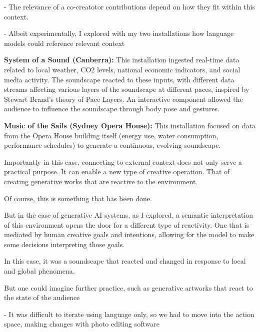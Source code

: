- The relevance of a co-creatotor contributions depend on how they fit within this context. 

- Albeit experimentally, I explored with my two installations how language models could reference relevant context

    \item \textbf{System of a Sound (Canberra):} This installation ingested real-time data related to local weather, CO2 levels, national economic indicators, and social media activity. The soundscape reacted to these inputs, with different data streams affecting various layers of the soundscape at different paces, inspired by Stewart Brand's theory of Pace Layers. An interactive component allowed the audience to influence the soundscape through body pose and gestures.
    \item \textbf{Music of the Sails (Sydney Opera House):} This installation focused on data from the Opera House building itself (energy use, water consumption, performance schedules) to generate a continuous, evolving soundscape.

Importantly in this case, connecting to external context does not only serve a practical purpose. 
It can enable a new type of creative operation. That of creating generative works that are reactive to the environment. 

Of course, this is something that has been done. 

But in the case of generative AI systems, as I explored, a semantic interpretation of this environment opens the door for a different type of reactivity. One that is mediated by human creative goals and intentions, allowing for the model to make some decisions interpreting those goals. 

In this case, it was a soundscape that reacted and changed in response to local and global phenomena. 

But one could imagine further practice, such as generative artworks that react to the state of the audience























- It was difficult to iterate using language only, so we had to move into the action space, making changes with photo editing software

